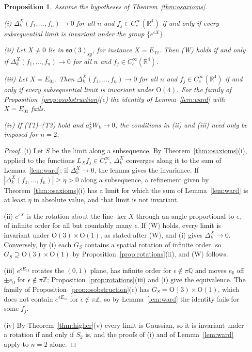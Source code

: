 \documentclass[aps,prd,twocolumn,superscriptaddress,nofootinbib,longbibliography,floatfix,amsmath,amssymb,10pt]{revtex4-2}
\newtheorem{proposition}[theorem]{Proposition}
\theoremstyle{definition}
\theoremstyle{remark}
\newcommand{\R}{\mathbb{R}}
\newcommand{\Z}{\mathbb{Z}}
\begin{document}
\begin{proposition}\label{prop:wardform}
Assume the hypotheses of Theorem~\textup{\ref{thm:osaxioms}}.

\textup{(i)} $\Delta^X_k(f_1,\dots,f_n)\to0$ for all $n$ and $f_j\in
C^\infty_c(\R^4)$ if and only if every subsequential limit is invariant
under the group $\{e^{\epsilon X}\}$.

\textup{(ii)} Let $X\ne0$ lie in $\mathfrak{so}(3)_{\mathrm{sp}}$, for
instance $X=E_{12}$. Then \textup{(W)} holds if and only if
$\Delta^X_k(f_1,\dots,f_n)\to0$ for all $n$ and $f_j\in C^\infty_c(\R^4)$.

\textup{(iii)} Let $X=E_{01}$. Then $\Delta^X_k(f_1,\dots,f_n)\to0$ for
all $n$ and $f_j\in C^\infty_c(\R^4)$ if and only if every subsequential
limit is invariant under $\mathrm O(4)$. For the family of
Proposition~\textup{\ref{prop:osobstruction}(c)} the identity of
Lemma~\textup{\ref{lem:ward}} with $X=E_{01}$ fails.

\textup{(iv)} If \textup{(T1)--(T3)} hold and $a_k^4W_k\to0$, the
conditions in \textup{(ii)} and \textup{(iii)} need only be imposed for
$n=2$.
\end{proposition}

\begin{proof}
(i) Let $S$ be the limit along a subsequence. By
Theorem~\ref{thm:osaxioms}(i), applied to the functions $L_Xf_j\in
C^\infty_c$, $\Delta^X_k$ converges along it to the sum of
Lemma~\ref{lem:ward}; if $\Delta^X_k\to0$, the lemma gives the
invariance. If $|\Delta^X_k(f_1,\dots,f_n)|\ge\eta>0$ along a subsequence,
a refinement given by Theorem~\ref{thm:osaxioms}(i) has a limit for which
the sum of Lemma~\ref{lem:ward} is at least $\eta$ in absolute value, and
that limit is not invariant.

(ii) $e^{\epsilon X}$ is the rotation about the line $\ker X$ through an
angle proportional to $\epsilon$, of infinite order for all but countably
many $\epsilon$. If (W) holds, every limit is invariant under $\mathrm
O(3)\times\mathrm O(1)$, as stated after (W), and (i) gives $\Delta^X_k\to0$.
Conversely, by (i) each $G_S$ contains a spatial rotation of infinite
order, so $G_S\supseteq\mathrm O(3)\times\mathrm O(1)$ by
Proposition~\ref{prop:rotations}(ii), and (W) follows.

(iii) $e^{\epsilon E_{01}}$ rotates the $(0,1)$ plane, has infinite order
for $\epsilon\notin\pi\mathbb Q$ and moves $e_0$ off $\pm e_0$ for
$\epsilon\notin\pi\Z$; Proposition~\ref{prop:rotations}(iii) and (i) give
the equivalence. The family of Proposition~\ref{prop:osobstruction}(c)
has $G_S=\mathrm O(3)\times\mathrm O(1)$, which does not contain
$e^{\epsilon E_{01}}$ for $\epsilon\notin\pi\Z$, so by
Lemma~\ref{lem:ward} the identity fails for some $f_j$.

(iv) By Theorem~\ref{thm:higher}(v) every limit is Gaussian, so it is
invariant under a rotation if and only if $S_2$ is, and the proofs of (i)
and of Lemma~\ref{lem:ward} apply to $n=2$ alone.
\end{proof}
\end{document}

